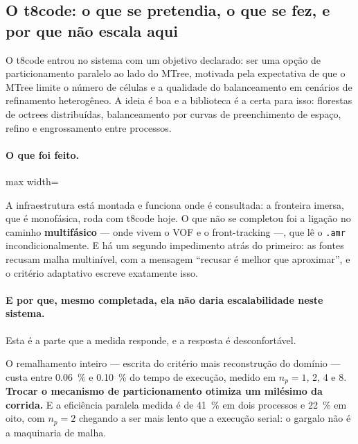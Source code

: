\subsection{O t8code: o que se pretendia, o que se fez, e por que n\~ao escala aqui}
\label{sec:t8code}

O t8code entrou no sistema com um objetivo declarado: ser uma op\c{c}\~ao de
particionamento paralelo ao lado do MTree, motivada pela expectativa de que o
MTree limite o n\'umero de c\'elulas e a qualidade do balanceamento em cen\'arios
de refinamento heterog\^eneo. A ideia \'e boa e a biblioteca \'e a certa para
isso: florestas de octrees distribu\'idas, balanceamento por curvas de
preenchimento de espa\c{c}o, refino e engrossamento entre processos.

\paragraph{O que foi feito.}\mbox{}

\begin{adjustbox}{max width=\linewidth}
\end{adjustbox}

A infraestrutura est\'a montada e funciona onde \'e consultada: a fronteira
imersa, que \'e monof\'asica, roda com t8code hoje. O que n\~ao se completou foi
a liga\c{c}\~ao no caminho \textbf{multif\'asico} --- onde vivem o VOF e o
front-tracking ---, que l\^e o \texttt{.amr} incondicionalmente. E h\'a um segundo
impedimento atr\'as do primeiro: as fontes recusam malha multin\'ivel, com a
mensagem ``recusar \'e melhor que aproximar'', e o crit\'erio adaptativo escreve
exatamente isso.

\paragraph{E por que, mesmo completada, ela n\~ao daria escalabilidade neste
sistema.} Esta \'e a parte que a medida responde, e a resposta \'e desconfort\'avel.

O remalhamento inteiro --- escrita do crit\'erio mais reconstru\c{c}\~ao do
dom\'inio --- custa entre \SI{0.06}{\percent} e \SI{0.10}{\percent} do tempo de
execu\c{c}\~ao, medido em $n_p = 1$, 2, 4 e 8. \textbf{Trocar o mecanismo de
particionamento otimiza um mil\'esimo da corrida.} E a efici\^encia paralela
medida \'e de \SI{41}{\percent} em dois processos e \SI{22}{\percent} em oito, com
$n_p=2$ chegando a ser mais lento que a execu\c{c}\~ao serial: o gargalo n\~ao \'e
a maquinaria de malha.

